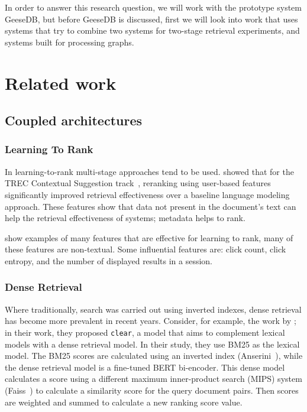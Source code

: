In order to answer this research question, we will work with the prototype system GeeseDB, but before GeeseDB is discussed, first we will look into work that uses systems that try to combine two systems for two-stage retrieval experiments, and systems built for processing graphs.


\section{Related work }
\subsection{Coupled architectures}
\subsubsection{Learning To Rank}
In learning-to-rank multi-stage approaches tend to be used.  showed that for the TREC Contextual Suggestion track~\cite {contextual-suggestion-track}, reranking using user-based features significantly improved retrieval effectiveness over a baseline language modeling approach. These features show that data not present in the document's text can help the retrieval effectiveness of systems; metadata helps to rank. 

 show examples of many features that are effective for learning to rank, many of these features are non-textual. Some influential features are: click count, click entropy, and the number of displayed results in a session.  

\subsubsection{Dense Retrieval}
Where traditionally, search was carried out using inverted indexes, dense retrieval has become more prevalent in recent years. Consider, for example, the work by \citet{dense-retrieval-1}; in their work, they proposed \texttt{clear}, a model that aims to complement lexical models with a dense retrieval model. In their study, they use BM25 as the lexical model. The BM25 scores are calculated using an inverted index (Anserini~\citep{anserini}), while the dense retrieval model is a fine-tuned BERT bi-encoder. This dense model calculates a score using a different maximum inner-product search (MIPS) system (Faiss~\citep{faiss}) to calculate a similarity score for the query document pairs. Then scores are weighted and summed to calculate a new ranking score value. 

